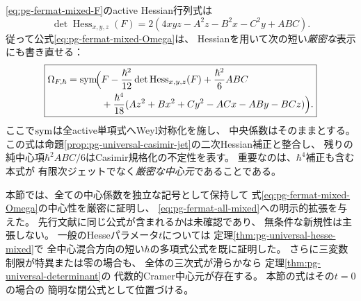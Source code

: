 \begin{remark}[Hessianジェットとの一致と新規性]
\label{rem:pg-fermat-mixed-hessian}
\eqref{eq:pg-fermat-mixed-F}のactive Hessian行列式は
\begin{equation}
 \det\operatorname{Hess}_{x,y,z}(F)
 =2(4xyz-A^2z-B^2x-C^2y+ABC).
\end{equation}
従って公式\eqref{eq:pg-fermat-mixed-Omega}は、
Hessianを用いて次の短い\emph{厳密な}表示にも書き直せる：
\begin{equation}
\boxed{\begin{aligned}
\Omega_{F,\hbar}
 =\operatorname{sym}\!\Bigl(&F-\frac{\hbar^2}{12}\det\operatorname{Hess}_{x,y,z}(F)
 +\frac{\hbar^2}{6}ABC\\
 &+\frac{\hbar^4}{18}
 (Az^2+Bx^2+Cy^2-ACx-ABy-BCz)\Bigr).
\end{aligned}}
\label{eq:pg-fermat-mixed-hessian}
\end{equation}
ここで$\operatorname{sym}$は全active単項式へWeyl対称化を施し、
中央係数はそのままとする。
この式は命題\ref{prop:pg-universal-casimir-jet}の二次Hessian補正と整合し、
残りの純中心項$\hbar^2ABC/6$はCasimir規格化の不定性を表す。
重要なのは、$\hbar^4$補正も含む本式が
有限次ジェットでなく\emph{厳密な中心元}であることである。

本節では、全ての中心係数を独立な記号として保持して
式\eqref{eq:pg-fermat-mixed-Omega}の中心性を厳密に証明し、
\eqref{eq:pg-fermat-all-mixed}への明示的拡張を与えた。
先行文献に同じ公式が含まれるかは未確認であり、
無条件な新規性は主張しない。
一般のHesseパラメータ$t$については
定理\ref{thm:pg-universal-hesse-mixed}で
全中心混合方向の短い$\hbar$の多項式公式を既に証明した。
さらに三変数制限が特異または零の場合も、
全体の三次式が滑らかなら
定理\ref{thm:pg-universal-determinant}の
代数的Cramer中心元が存在する。
本節の式はその$t=0$の場合の
簡明な閉公式として位置づける。
\end{remark}
